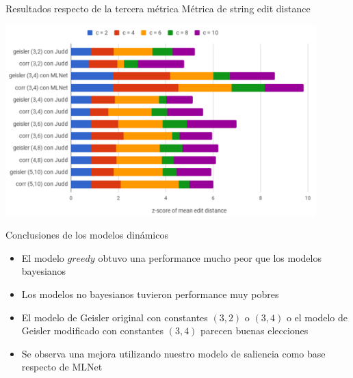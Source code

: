 \documentclass[compress]{beamer}
\begin{document}
\begin{frame}{Resultados respecto de la tercera métrica}
{Métrica de string edit distance}

\begin{center}
\includegraphics[width=0.9\textwidth]{images/z-score-mean-edit-distance.png}
\end{center}

\end{frame}


\begin{frame}{Conclusiones de los modelos dinámicos}
\begin{itemize}
\item El modelo $greedy$ obtuvo una performance mucho peor que los modelos bayesianos
\item Los modelos no bayesianos tuvieron performance muy pobres
\item El modelo de Geisler original con constantes $(3,2)$ o $(3,4)$ o el modelo de Geisler modificado con constantes $(3,4)$ parecen buenas elecciones
\item Se observa una mejora utilizando nuestro modelo de saliencia como base respecto de MLNet
\end{itemize}
\end{frame}
\end{document}
